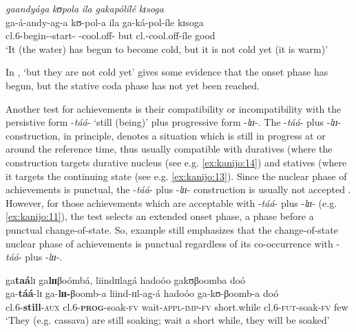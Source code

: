 \documentclass[output=paper,newtxmath,modfonts,nonflat,draftmode]{langsci/langscibook}
\begin{document}
\ea \label{ex:kanijo:9}
\glll \textit{gaandyága} \textit{kʊ}\textit{pola} \textit{ila} \textit{gakapólílé} \textit{kɪ}\textit{soga}\\
ga-á-andy-ag-a kʊ-pol-a ila ga-ká-pol-íle kɪsoga\\   
cl.\textsc{6}-begin--start- -cool.off- but cl.-cool.off-íle good\\
\glt ‘It (the water) has begun to become cold, but it is not cold yet (it is warm)’\\
\z

In , ‘but they are not cold yet’ gives some evidence that the onset phase has begun, but the stative coda phase has not yet been reached.

Another test for achievements is their compatibility or incompatibility with the persistive form -\textit{táá}- ‘still (being)’ plus progressive form -\textit{lɪɪ}-. The -\textit{táá}- plus -\textit{lɪɪ}- construction, in principle, denotes a situation which is still in progress at or around the reference time, thus usually compatible with duratives (where the construction targets durative nucleus (see e.g. \ref{ex:kanijo:14}) and statives (where it targets the continuing state (see e.g. \ref{ex:kanijo:13}). Since the nuclear phase of achievements is punctual, the -\textit{táá}- plus -\textit{lɪɪ}- construction is usually not accepted . However, for those achievements which are acceptable with -\textit{táá}- plus -\textit{lɪɪ}- (e.g. \ref{ex:kanijo:11}), the test selects an extended onset phase, a phase before a punctual change-of-state. So, example  still emphasizes that the change-of-state nuclear phase of achievements is punctual regardless of its co-occurrence with -\textit{táá}- plus -\textit{lɪɪ}-. 

\label{ex:kanijo:10}
\z

\ea \label{ex:kanijo:11}
\glll ga\textbf{taá}lɪ ga\textbf{l}\textbf{ɪɪ}βoómbá,  liindɪɪlagá hadoóo  gakʊβoomba doó\\
ga-\textbf{táá}-lɪ ga-\textbf{lɪɪ-}βoomb-a liind-ɪɪl-ag-á hadoóo       ga-kʊ-βoomb-a    doó\\ 
cl.6-\textbf{still}-\textsc{aux} cl.6-\textbf{\textsc{prog}}-soak-\textsc{fv} wait-\textsc{appl}-\textsc{imp}-\textsc{fv} short.while cl.6-\textsc{fut}-soak-\textsc{fv} few\\
\glt ‘They (e.g. cassava) are still soaking; wait a short while, they will be soaked’
\z
\end{document}
